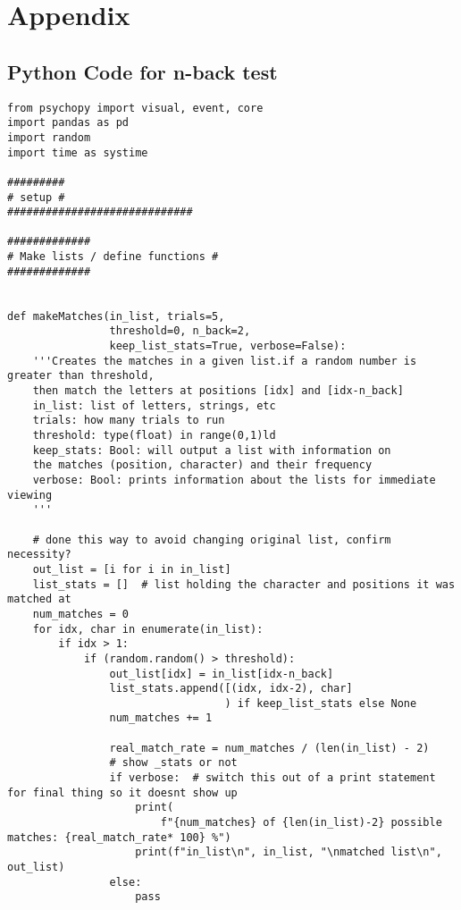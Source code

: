 \documentclass{article}
\begin{document}


\section{Appendix}
\label{sec:org4bdb128}
\subsection{Python Code for n-back test}
\label{sec:orgebf3c91}
\begin{verbatim}
from psychopy import visual, event, core
import pandas as pd
import random
import time as systime

#########
# setup #
#############################

#############
# Make lists / define functions #
#############


def makeMatches(in_list, trials=5,
                threshold=0, n_back=2,
                keep_list_stats=True, verbose=False):
    '''Creates the matches in a given list.if a random number is greater than threshold,
    then match the letters at positions [idx] and [idx-n_back]
    in_list: list of letters, strings, etc
    trials: how many trials to run
    threshold: type(float) in range(0,1)ld
    keep_stats: Bool: will output a list with information on
    the matches (position, character) and their frequency
    verbose: Bool: prints information about the lists for immediate viewing
    '''

    # done this way to avoid changing original list, confirm necessity?
    out_list = [i for i in in_list]
    list_stats = []  # list holding the character and positions it was matched at
    num_matches = 0
    for idx, char in enumerate(in_list):
        if idx > 1:
            if (random.random() > threshold):
                out_list[idx] = in_list[idx-n_back]
                list_stats.append([(idx, idx-2), char]
                                  ) if keep_list_stats else None
                num_matches += 1

                real_match_rate = num_matches / (len(in_list) - 2)
                # show _stats or not
                if verbose:  # switch this out of a print statement for final thing so it doesnt show up
                    print(
                        f"{num_matches} of {len(in_list)-2} possible matches: {real_match_rate* 100} %")
                    print(f"in_list\n", in_list, "\nmatched list\n", out_list)
                else:
                    pass


\end{verbatim}
\end{document}
